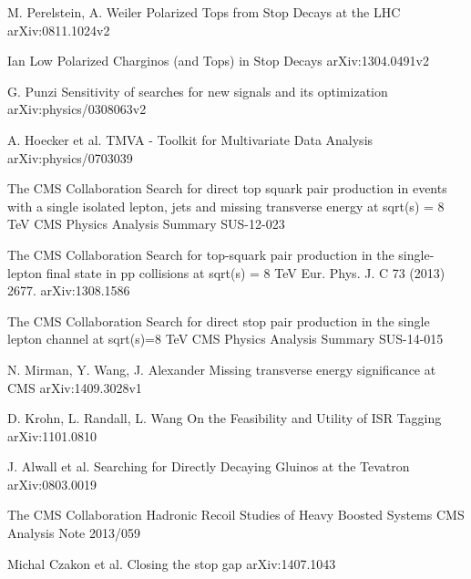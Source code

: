 \begin{thebibliography}{2}

             {M. Perelstein, A. Weiler}
             {Polarized Tops from Stop Decays at the LHC}
             {arXiv:0811.1024v2}

             {Ian Low}
             {Polarized Charginos (and Tops) in Stop Decays}
             {arXiv:1304.0491v2}


             {G. Punzi}
             {Sensitivity of searches for new signals and its optimization}
             {arXiv:physics/0308063v2}

             {A. Hoecker et al.}
             {TMVA - Toolkit for Multivariate Data Analysis}
             {arXiv:physics/0703039}


             {The CMS Collaboration}
             {Search for direct top squark pair production in events with a single isolated lepton, jets and missing transverse energy at sqrt(s) = 8 TeV}
             {CMS Physics Analysis Summary SUS-12-023}

             {The CMS Collaboration}
             {Search for top-squark pair production in the single-lepton final state in pp collisions at sqrt(s) = 8 TeV}
             {Eur. Phys. J. C 73 (2013) 2677. arXiv:1308.1586}

             {The CMS Collaboration}
             {Search for direct stop pair production in the single lepton channel at sqrt(s)=8 TeV}
             {CMS Physics Analysis Summary SUS-14-015}


             {N. Mirman, Y. Wang, J. Alexander}
             {Missing transverse energy significance at CMS}
             {arXiv:1409.3028v1}


             {D. Krohn, L. Randall, L. Wang}
             {On the Feasibility and Utility of ISR Tagging}
             {arXiv:1101.0810}

             {J. Alwall et al.}
             {Searching for Directly Decaying Gluinos at the Tevatron}
             {arXiv:0803.0019}

             {The CMS Collaboration}
             {Hadronic Recoil Studies of Heavy Boosted Systems}
             {CMS Analysis Note 2013/059}


             {Michal Czakon et al.}
             {Closing the stop gap}
             {arXiv:1407.1043}

\end{thebibliography}



